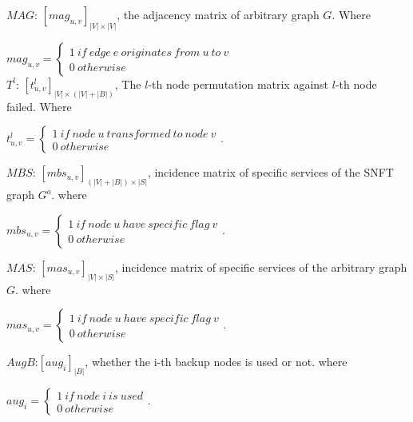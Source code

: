 $MAG$: $[mag_{u,v}]_{|V|\times |V|}$, the adjacency matrix of arbitrary graph $G$. Where

${mag_{u,v}}=\left\{ \begin{array}{l}
1\ if\ edge\ e\ originates\ from\ u\ to\ v\\
0\ otherwise
\end{array} \right.$ \\

$T^{l}$: $[t^l_{u,v}]_{|V|\times (|V|+|B|)}$, The $l$-th node permutation matrix against $l$-th node failed. Where

${t^l_{u,v}}=\left\{ \begin{array}{l}1\ if\ node\ u\ transformed\ to\ node\ v\\
0\ otherwise
\end{array} \right.$.

$MBS$: $[mbs_{u,v}]_{(|V|+|B|)\times |S|}$, incidence matrix of specific services of the SNFT graph $G^o$. where

${mbs_{u,v}}=\left\{ \begin{array}{l}1\ if\ node\ u\ have\ specific\ flag\ v\\
0\ otherwise
\end{array} \right.$.

$MAS$: $[mas_{u,v}]_{|V|\times |S|}$, incidence matrix of  specific services of the arbitrary graph $G$. where

${mas_{u,v}}=\left\{ \begin{array}{l}1\ if\ node\ u\ have\ specific\ flag\ v\\
0\ otherwise
\end{array} \right.$.

$AugB$:$[aug_i]_{|B|}$, whether the i-th backup nodes is used or not. where

${aug_i}=\left\{ \begin{array}{l}1\ if\ node\ i\ is\ used\\
0\ otherwise
\end{array} \right.$.

